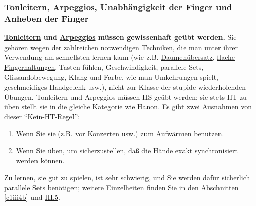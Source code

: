 
\subsubsection{Tonleitern, Arpeggios, Unabhängigkeit der Finger und Anheben der Finger}
\label{c1iii7d}

\textbf{\hyperref[c1iii5a]{Tonleitern} und \hyperref[Arpeggios]{Arpeggios} müssen gewissenhaft geübt werden.}
Sie gehören wegen der zahlreichen notwendigen Techniken, die man unter ihrer Verwendung am schnellsten lernen kann (wie z.B. \hyperref[c1iii5a]{Daumenübersatz}, \hyperref[c1iii4b]{flache Fingerhaltungen}, Tasten fühlen, Geschwindigkeit, parallele Sets, Glissandobewegung, Klang und Farbe, wie man Umkehrungen spielt, geschmeidiges Handgelenk usw.), nicht zur Klasse der stupide wiederholenden Übungen.
Tonleitern und Arpeggios müssen HS geübt werden; sie stets HT zu üben stellt sie in die gleiche Kategorie wie \hyperref[c1iii7h]{Hanon}.
Es gibt zwei Ausnahmen von dieser \enquote{Kein-HT-Regel}:

\begin{enumerate} 
 \item Wenn Sie sie (z.B. vor Konzerten usw.) zum Aufwärmen benutzen.
 \item Wenn Sie üben, um sicherzustellen, daß die Hände exakt synchronisiert werden können.
\end{enumerate}

Zu lernen, sie gut zu spielen, ist sehr schwierig, und Sie werden dafür sicherlich parallele Sets benötigen; weitere Einzelheiten finden Sie in den Abschnitten \hyperref[c1iii4b]{\autoref{c1iii4b}} und \hyperref[c1iii5a]{III.5}.


\label{c1iii7finger}

